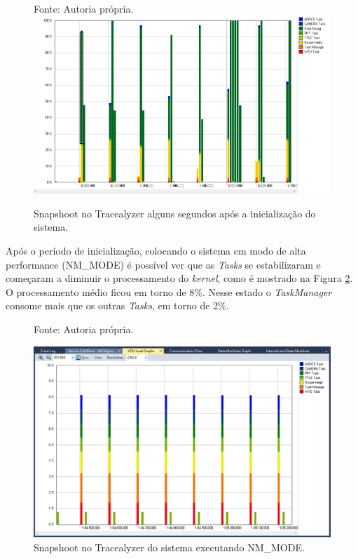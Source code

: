 \begin{figure}[h]
	\footnotesize{	
	\centering
			\centering
	\footnotesize{Fonte: Autoria própria.}
	\includegraphics[keepaspectratio=true,scale=0.51]{figuras/trace_snapshoot_2.PNG}
	\caption{Snapshoot no Tracealyzer alguns segundos após a inicialização do sistema.}
	\label{trace_snapshoot_2}
}
\end{figure}
\FloatBarrier

Após o período de inicialização, colocando o sistema em modo de alta performance (NM\_MODE) é possível ver que as \textit{Tasks} se estabilizaram e começaram a diminuir o processamento do \textit{kernel}, como é mostrado na Figura \ref{trace_snapshoot_3}. O processamento médio ficou em torno de 8\%. Nesse estado o \textit{TaskManager} consome mais que os outras \textit{Tasks}, em torno de 2\%. 

\begin{figure}[h]
	\centering
			\centering
	\footnotesize{Fonte: Autoria própria.}
	
	\includegraphics[keepaspectratio=true,scale=0.51]{figuras/trace_snapshoot_3.PNG}
	\caption{Snapshoot no Tracealyzer do sistema executando NM\_MODE.}
	\label{trace_snapshoot_3}
\end{figure}
\FloatBarrier

